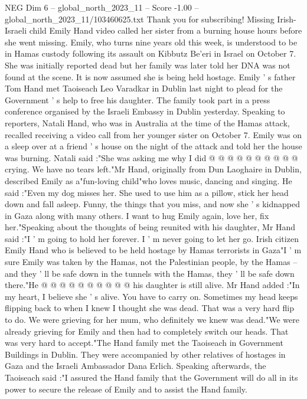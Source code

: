 \begin{textsample}{NEG Dim 6 – global\_north\_2023\_11 – Score -1.00 – global\_north\_2023\_11/103460625.txt}  \label{ex:f6_neg_229}
Thank you for subscribing!
Missing Irish-Israeli child Emily Hand video called her sister from a burning house hours before she went missing.
Emily, who turns nine years old this week, is understood to be in Hamas custody following its assault on Kibbutz Be'eri in Israel on October 7.
She was initially reported dead but her family was later told her DNA was not found at the scene.
It is now assumed she is being held hostage.
Emily ' s father Tom Hand met Taoiseach Leo Varadkar in Dublin last night to plead for the Government ' s help to free his daughter.
The family took part in a press conference organised by the Israeli Embassy in Dublin yesterday.
Speaking to reporters, Natali Hand, who was in Australia at the time of the Hamas attack, recalled receiving a video call from her younger sister on October 7.
Emily was on a sleep over at a friend ' s house on the night of the attack and told her the house was burning.
Natali said :"She was asking me why I did @ @ @ @ @ @ @ @ @ @ crying.
We have no tears left."Mr Hand, originally from Dun Laoghaire in Dublin, described Emily as a"fun-loving child"who loves music, dancing and singing.
He said :"Even my dog misses her.
She used to use him as a pillow, stick her head down and fall asleep.
Funny, the things that you miss, and now she ' s kidnapped in Gaza along with many others.
I want to hug Emily again, love her, fix her."Speaking about the thoughts of being reunited with his daughter, Mr Hand said :"I ' m going to hold her forever.
I ' m never going to let her go.
Irish citizen Emily Hand who is believed to be held hostage by Hamas terrorists in Gaza"I ' m sure Emily was taken by the Hamas, not the Palestinian people, by the Hamas -- and they ' ll be safe down in the tunnels with the Hamas, they ' ll be safe down there."He @ @ @ @ @ @ @ @ @ @ his daughter is still alive.
Mr Hand added :"In my heart, I believe she ' s alive.
You have to carry on.
Sometimes my head keeps flipping back to when I knew I thought she was dead.
That was a very hard flip to do.
We were grieving for her mum, who definitely we knew was dead."We were already grieving for Emily and then had to completely switch our heads.
That was very hard to accept."The Hand family met the Taoiseach in Government Buildings in Dublin.
They were accompanied by other relatives of hostages in Gaza and the Israeli Ambassador Dana Erlich.
Speaking afterwards, the Taoiseach said :"I assured the Hand family that the Government will do all in its power to secure the release of Emily and to assist the Hand family.

\end{textsample}
